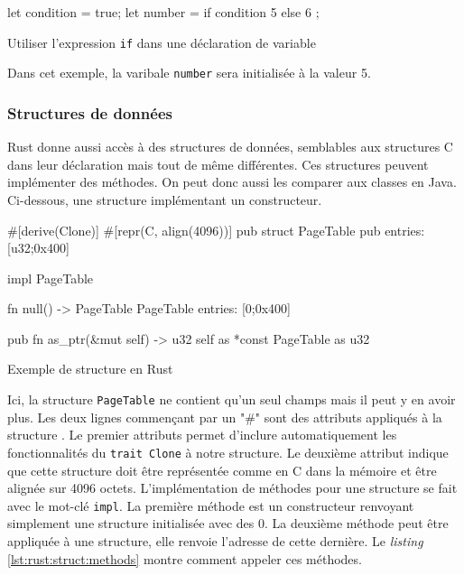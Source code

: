 \begin{code}
\begin{rustcode}
let condition = true;
let number = if condition {
    5
} else {
    6
};
\end{rustcode}
\caption{Utiliser l'expression \texttt{if} dans une déclaration de variable}
\label{lst:rust:if}
\end{code} \bigbreak

Dans cet exemple, la varibale \texttt{number} sera initialisée à la
valeur 5. \newpage

\subsubsection{Structures de données}
Rust donne aussi accès à des structures de données, semblables aux structures
C dans leur déclaration mais tout de même différentes. Ces structures peuvent
implémenter des méthodes. On peut donc aussi les comparer aux classes en Java.
Ci-dessous, une structure implémentant un constructeur.

\begin{code}
\begin{rustcode}
#[derive(Clone)]
#[repr(C, align(4096))]
pub struct PageTable {
    pub entries: [u32;0x400]
}

impl PageTable {
    fn null() -> PageTable {
        PageTable {
            entries: [0;0x400]
        }
    }
    
    pub fn as_ptr(&mut self) -> u32 {
        self as *const PageTable as u32
    }
}
\end{rustcode}
\caption{Exemple de structure en Rust}
\label{lst:rust:struct}
\end{code} \bigbreak

Ici, la structure \texttt{PageTable} ne contient qu'un seul champs
mais il peut y en avoir plus. Les deux lignes commençant par un "\#" sont des attributs
appliqués à la structure \cite{ref2}. Le premier attributs permet d'inclure automatiquement
les fonctionnalités du \texttt{trait Clone} à notre structure. Le deuxième attribut
indique que cette structure doit être représentée comme en C dans la mémoire et
être alignée sur 4096 octets. L'implémentation de méthodes pour une structure se
fait avec le mot-clé \texttt{impl}. La première méthode est un constructeur
renvoyant simplement une structure initialisée avec des 0. La deuxième méthode peut
être appliquée à une structure, elle renvoie l'adresse de cette dernière. Le \textit{listing}
\ref{lst:rust:struct:methods} montre comment appeler ces méthodes.


